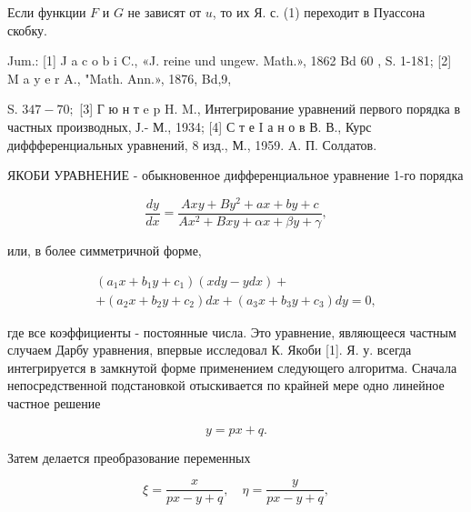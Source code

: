 \documentclass[10pt]{article}
\begin{document}
Если функции $F$ и $G$ не зависят от $u$, то их Я. с. (1) переходит в Пуассона скобку.



Jum.: [1] J a c o b i C., «J. reine und ungew. Math.», 1862 Bd 60 , S. 1-181; [2] M a y e r A., "Math. Ann.», 1876, Bd,9,

S. $347-70 ;$ [3] Г ю н т e p H. M., Интегрирование уравнений первого порядка в частных производных, Ј.- М., 1934; [4] С т е I а н о в В. В., Курс диффференциальных уравнений, 8 изд., М., 1959. A. П. Солдатов.



ЯКОБИ УРАВНЕНИЕ - обыкновенное дифференциальное уравнение 1-го порядка



\[

\frac{d y}{d x}=\frac{A x y+B y^{2}+a x+b y+c}{A x^{2}+B x y+\alpha x+\beta y+\gamma},

\]



или, в более симметричной форме,



\[

\begin{gathered}

\left(a_{1} x+b_{1} y+c_{1}\right)(x d y-y d x)+ \\

+\left(a_{2} x+b_{2} y+c_{2}\right) d x+\left(a_{3} x+b_{3} y+c_{3}\right) d y=0,

\end{gathered}

\]



где все коэффициенты - постоянные числа. Это уравнение, являющееся частным случаем Дарбу уравнения, впервые исследовал К. Якоби [1]. Я. у. всегда интегрируется в замкнутой форме применением следующего алгоритма. Сначала непосредственной подстановкой отыскивается по крайней мере одно линейное частное решение



\[

y=p x+q .

\]



Затем делается преобразование переменных



\[

\xi=\frac{x}{p x-y+q}, \quad \eta=\frac{y}{p x-y+q},

\]
\end{document}
